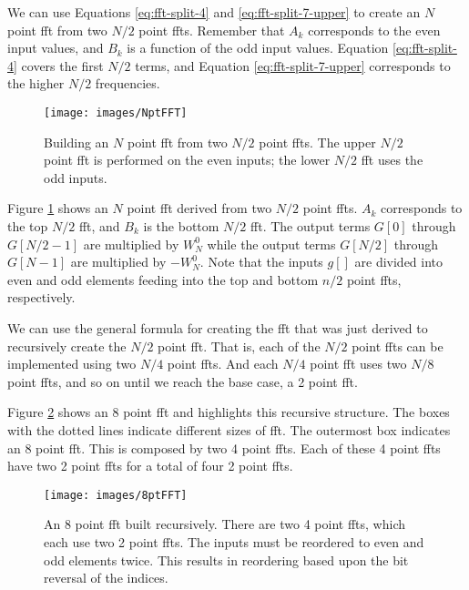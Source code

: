 We can use Equations \ref{eq:fft-split-4} and \ref{eq:fft-split-7-upper} to create an $N$ point \gls{fft} from two $N/2$ point \gls{fft}s. Remember that $A_k$ corresponds to the even input values, and $B_k$ is a function of the odd input values. Equation \ref{eq:fft-split-4} covers the first $N/2$ terms, and Equation \ref{eq:fft-split-7-upper} corresponds to the higher $N/2$ frequencies. 

\begin{figure}
\centering
\texttt{[image: images/NptFFT]}
\caption{Building an $N$ point \gls{fft} from two $N/2$ point \gls{fft}s. The upper $N/2$ point \gls{fft} is performed on the even inputs; the lower $N/2$ \gls{fft} uses the odd inputs. }
\label{fig:NptFFT}
\end{figure}

Figure \ref{fig:NptFFT} shows an $N$ point \gls{fft} derived from two $N/2$ point \gls{fft}s. $A_k$ corresponds to the top $N/2$ \gls{fft}, and $B_k$ is the bottom $N/2$ \gls{fft}.  The output terms $G[0]$ through $G[N/2-1]$ are multiplied by $W_N^0$ while the output terms $G[N/2]$ through $G[N-1]$ are multiplied by $-W_N^0$. Note that the inputs $g[]$ are divided into even and odd elements feeding into the top and bottom $n/2$ point \gls{fft}s, respectively.

We can use the general formula for creating the \gls{fft} that was just derived to recursively create the $N/2$ point \gls{fft}. That is, each of the $N/2$ point \gls{fft}s can be implemented using two $N/4$ point \gls{fft}s. And each $N/4$ point \gls{fft} uses two $N/8$ point \gls{fft}s, and so on until we reach the base case, a 2 point \gls{fft}.

Figure \ref{fig:8ptFFT} shows an 8 point \gls{fft} and highlights this recursive structure. The boxes with the dotted lines indicate different sizes of \gls{fft}. The outermost box indicates an 8 point \gls{fft}. This is composed by two 4 point \gls{fft}s. Each of these 4 point \gls{fft}s have two 2 point \gls{fft}s for a total of four 2 point \gls{fft}s. 

\begin{figure}
\centering
\texttt{[image: images/8ptFFT]}
\caption{An 8 point \gls{fft} built recursively. There are two 4 point \gls{fft}s, which each use two 2 point \gls{fft}s. The inputs must be reordered to even and odd elements twice. This results in reordering based upon the bit reversal of the indices.}
\label{fig:8ptFFT}
\end{figure}

